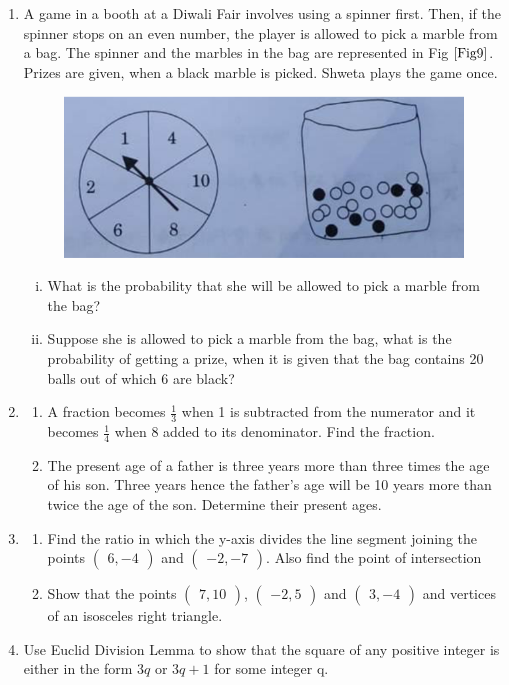 \documentclass[journal,12pt,twocolumn]{IEEEtran}
\newcommand{\myvec}[1]{\ensuremath{\begin{pmatrix}#1\end{pmatrix}}}
\begin{document}
\begin{enumerate}[label=4.\arabic*]
    \item A game in a booth at a Diwali Fair involves using a spinner first. Then, if the spinner stops on an even number, the player is allowed to pick a marble from a bag. The spinner and the marbles in the bag are represented in Fig $\ref{Fig9}$.\\
    Prizes are given, when a black marble is picked. Shweta plays the game once.
    \begin{figure}[h!]
        \centering
        \includegraphics[width=0.5\columnwidth,center]{Fig9.png}
	    \caption{}
	    \label{Fig9}
    \end{figure} 
    \begin{enumerate}[i)]
        \item What is the probability that she will be allowed to pick a marble from the bag?\\
        \item Suppose she is allowed to pick a marble from the bag, what is the probability of getting a prize, when it is given that the bag contains 20 balls out of which 6 are black?\\
    \end{enumerate}
    \item \begin{enumerate}
        \item A fraction becomes $\frac{1}{3}$ when 1 is subtracted from the numerator and it becomes $\frac{1}{4}$ when 8 added to its denominator. Find the fraction.\\
        \item The present age of a father is three years more than three times the age of his son. Three years hence the father's age will be 10 years more than twice the age of the son. Determine their present ages.\\
    \end{enumerate} 
    \item \begin{enumerate}
        \item Find the ratio in which the y-axis divides the line segment joining the points $\myvec{6, -4}$ and $\myvec{-2, -7}$. Also find the point of intersection\\
        \item Show that the points $\myvec{7, 10}$, $\myvec{-2,5}$ and $\myvec{3, -4}$ and vertices of an isosceles right triangle.
    \end{enumerate}
    \item Use Euclid Division Lemma to show that the square of any positive integer is either in the form $3q$ or $3q + 1$ for some integer q.\\

\end{enumerate}
\end{document}
